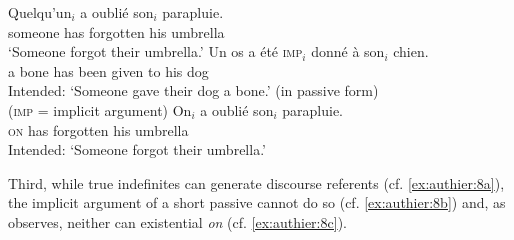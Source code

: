 \documentclass[output=paper,colorlinks,citecolor=brown]{langscibook}
\begin{document}
\begin{exe} %
    \ex \label{ex:authier:7}
    \begin{xlist} %
        \ex \label{ex:authier:7a}
            \gll    Quelqu’un$_{i}$ a     oublié     son$_{i}$ parapluie. \\   %
                    someone    has  forgotten his  umbrella \\    %
            \glt    `Someone forgot their umbrella.' %
        \ex\label{ex:authier:7b}
            \gll    *Un os a été \textsc{imp}$_{i}$ donné à son$_{i}$ chien. \\    %
                    a bone has been {} given  to his dog\\
            \glt    Intended: `Someone gave their dog a bone.' (in passive form)\\
            (\textsc{imp} = implicit argument)
        \ex\label{ex:authier:7c}
             \gll    *On$_{i}$ a     oublié      son$_{i}$ parapluie. \\  
                    \textsc{on}  has forgotten  his  umbrella \\
            \glt    Intended: `Someone forgot their umbrella.'
    \end{xlist}
\end{exe}

Third, while true indefinites can generate discourse referents (cf. \ref{ex:authier:8a}), the implicit argument of a short passive cannot do so (cf. \ref{ex:authier:8b}) and, as \citet[241]{koenig1999a} observes, neither can existential \textit{on} (cf. \ref{ex:authier:8c}). 
\end{document}
